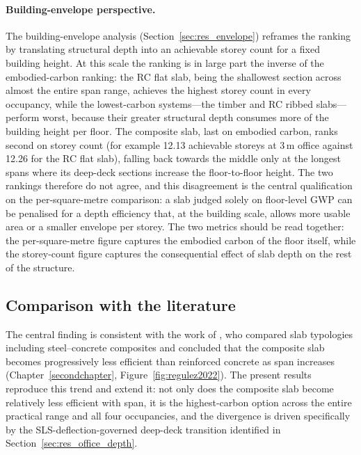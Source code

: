 \paragraph{Building-envelope perspective.} The building-envelope analysis (Section~\ref{sec:res_envelope}) reframes the ranking by translating structural depth into an achievable storey count for a fixed building height. At this scale the ranking is in large part the inverse of the embodied-carbon ranking: the RC flat slab, being the shallowest section across almost the entire span range, achieves the highest storey count in every occupancy, while the lowest-carbon systems---the timber and RC ribbed slabs---perform worst, because their greater structural depth consumes more of the building height per floor. The composite slab, last on embodied carbon, ranks second on storey count (for example 12.13 achievable storeys at 3\,m office against 12.26 for the RC flat slab), falling back towards the middle only at the longest spans where its deep-deck sections increase the floor-to-floor height. The two rankings therefore do not agree, and this disagreement is the central qualification on the per-square-metre comparison: a slab judged solely on floor-level GWP can be penalised for a depth efficiency that, at the building scale, allows more usable area or a smaller envelope per storey. The two metrics should be read together: the per-square-metre figure captures the embodied carbon of the floor itself, while the storey-count figure captures the consequential effect of slab depth on the rest of the structure.

\subsection{Comparison with the literature}
\label{sec:disc_literature}
The central finding is consistent with the work of \cite{RefWorks:regulez2022sustainability}, who compared slab typologies including steel--concrete composites and concluded that the composite slab becomes progressively less efficient than reinforced concrete as span increases (Chapter~\ref{secondchapter}, Figure~\ref{fig:regulez2022}). The present results reproduce this trend and extend it: not only does the composite slab become relatively less efficient with span, it is the highest-carbon option across the entire practical range and all four occupancies, and the divergence is driven specifically by the SLS-deflection-governed deep-deck transition identified in Section~\ref{sec:res_office_depth}.

